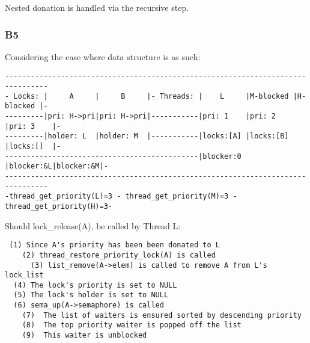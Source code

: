 \documentclass[a4wide, 11pt]{article}
\begin{document}
Nested donation is handled via the recursive step.

\subsubsection{B5}

Considering the case where data structure is as such:

\begin{verbatim}
--------------------------------------------------------------------------------
- Locks: |     A     |     B     |- Threads: |    L     |M-blocked |H-blocked |-
---------|pri: H->pri|pri: H->pri|-----------|pri: 1    |pri: 2    |pri: 3    |-
---------|holder: L  |holder: M  |-----------|locks:[A] |locks:[B] |locks:[]  |-
---------------------------------------------|blocker:0 |blocker:&L|blocker:&M|-
--------------------------------------------------------------------------------
-thread_get_priority(L)=3 - thread_get_priority(M)=3 - thread_get_priority(H)=3-
\end{verbatim}

Should lock\_release(A), be called by Thread L:
\begin{verbatim}
 (1) Since A's priority has been been donated to L
    (2) thread_restore_priority_lock(A) is called
      (3) list_remove(A->elem) is called to remove A from L's lock_list
  (4) The lock's priority is set to NULL
  (5) The lock's holder is set to NULL
  (6) sema_up(A->semaphore) is called
    (7)  The list of waiters is ensured sorted by descending priority
    (8)  The top priority waiter is popped off the list
    (9)  This waiter is unblocked
\end{verbatim}
\end{document}
